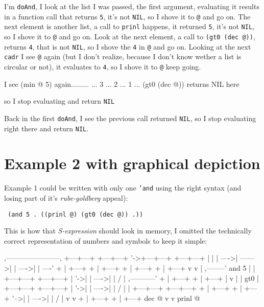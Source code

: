 I'm \texttt{doAnd}, I look at the list I was passed, the first
argument, evaluating it results in a function call that returns
\texttt{5}, it's not \texttt{NIL}, so I shove it to \texttt{@} and go
on. The next element is another list, a call to \texttt{prinl}
happens, it returned \texttt{5}, it's not \texttt{NIL}, so I shove it
to \texttt{@} and go on. Look at the next element, a call to
\texttt{(gt0 (dec @))}, returns \texttt{4}, that is not \texttt{NIL},
so I shove the \texttt{4} in \texttt{@} and go on. Looking at the next
\texttt{cadr} I see \texttt{@} again (but I don't realize, because I
don't know wether a list is circular or not), it evaluates to
\texttt{4}, so I shove it to \texttt{@} keep going.

\begin{wideverbatim}
I see (min @ 5) again.........
 ... 3
 ... 2
 ... 1
 ... (gt0 (dec @)) returns NIL here
\end{wideverbatim}


so I stop evaluating and return \texttt{NIL}

Back in the first \texttt{doAnd}, I see the previous call returned
\texttt{NIL}, so I stop evaluating right there and return
\texttt{NIL}.

\section{Example 2 with graphical depiction}
\label{sec:circ-lists-example-2-with-graphical-depiction}

Example 1 could be written with only one \texttt{'and} using the right
syntax (and losing part of it's \emph{rube-goldberg} appeal):

\texttt{ (and 5 . ((prinl @) (gt0 (dec @)) .)) }

This is how that \emph{S-expression} should look in memory, I omitted
the technically correct representation of numbers and symbols to keep
it simple:

\begin{wideverbatim}
  
                      ,-----------------------,
 +---+---+  +---+---+ '->+---+---+  +---+---+ |
 |   | ---->|     ------>|   | ---->|   | ----'
 + | +---+  + | +---+    + | +---+  + | +---+
   v          v            | ,--------'
  and         5            | |  +---+---+  +---+---+
                           | '->|   | ---->|   | / |
               ,-----------'    + | +---+  + | +---+
               |                  v          |
               |                 gt0         |  +---+---+  +---+---+
               |                             '->|   | ---->|   | / |
               |   +---+---+  +---+---+         + | +---+  + | +---+
               '-->|   | ---->|   | / |           v          v
                   + | +---+  + | +---+          dec         @
                     v          v
                   prinl        @

\end{wideverbatim}

